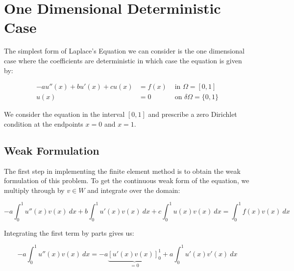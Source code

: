 \chapter{One Dimensional Deterministic Case}\label{chap:oned-deterministic}


The simplest form of Laplace's Equation we can consider is the one dimensional
case where the coefficients are deterministic in which case the equation is
given by:

\begin{equation}\label{eq:oned-deterministic}
\begin{aligned}
    -au''(x) + bu'(x) + cu(x) &= f(x) &\text{ in } \Omega = [0, 1] \\
                         u(x) &= 0 &\text{ on } \delta\Omega = \{0, 1\}
\end{aligned}
\end{equation}

We consider the equation in the interval $[0,1]$ and prescribe a zero Dirichlet
condition at the endpoints $x = 0$ and $x = 1$.


\section{Weak Formulation}


The first step in implementing the finite element method is to obtain the weak
formulation of this problem. To get the continuous weak form of the equation,
we multiply through by $v \in W$ and integrate over the domain:

\begin{equation}
    -a\int_0^1{u''(x)v(x)\ dx} + b\int_0^1{u'(x)v(x)\ dx}
    + c\int_0^1{u(x)v(x)\ dx} = \int_0^1{f(x)v(x)\ dx}
\end{equation}

Integrating the first term by parts gives us:

\begin{equation}
    -a\int_0^1{u''(x)v(x)\ dx} = -a\underbrace{[ u'(x)v(x) ]_0^1}_{ = 0}
    + a\int_0^1{u'(x)v'(x)\ dx}
\end{equation}

